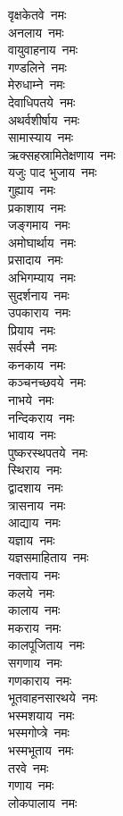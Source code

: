 \begin{multicols}{2}
\begin{flushleft}
वृक्षकेतवे~नमः\\
अनलाय~नमः\hfill{}\\
वायुवाहनाय~नमः\\
गण्डलिने~नमः\\
मेरुधाम्ने~नमः\\
देवाधिपतये~नमः\\
अथर्वशीर्षाय~नमः\\
सामास्याय~नमः\\
ऋक्सहस्रामितेक्षणाय~नमः\\
यजुः पाद भुजाय~नमः\\
गुह्याय~नमः\\
प्रकाशाय~नमः\hfill{}\\
जङ्गमाय~नमः\\
अमोघार्थाय~नमः\\
प्रसादाय~नमः\\
अभिगम्याय~नमः\\
सुदर्शनाय~नमः\\
उपकाराय~नमः\\
प्रियाय~नमः\\
सर्वस्मै~नमः\\
कनकाय~नमः\\
कञ्चनच्छवये~नमः\hfill{}\\
नाभये~नमः\\
नन्दिकराय~नमः\\
भावाय~नमः\\
पुष्करस्थपतये~नमः\\
स्थिराय~नमः\\
द्वादशाय~नमः\\
त्रासनाय~नमः\\
आद्याय~नमः\\
यज्ञाय~नमः\\
यज्ञसमाहिताय~नमः\hfill{}\\
नक्ताय~नमः\\
कलये~नमः\\
कालाय~नमः\\
मकराय~नमः\\
कालपूजिताय~नमः\\
सगणाय~नमः\\
गणकाराय~नमः\\
भूतवाहनसारथये~नमः\\
भस्मशयाय~नमः\\
भस्मगोप्त्रे~नमः\hfill{}\\
भस्मभूताय~नमः\\
तरवे~नमः\\
गणाय~नमः\\
लोकपालाय~नमः\\

\end{flushleft}
\end{multicols}
